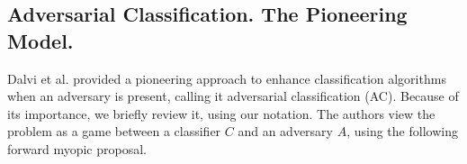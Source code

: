 \subsection{Adversarial Classification. The Pioneering Model.%
}
Dalvi et al. \cite{adversarialClassification2004} provided a pioneering approach to enhance classification algorithms when an adversary is present, calling it adversarial classification (AC).
 Because of its importance,
we briefly review it, using our notation. 
The authors view the problem as a game between a classifier $C$ and an adversary $A$,
using the following forward myopic proposal.


